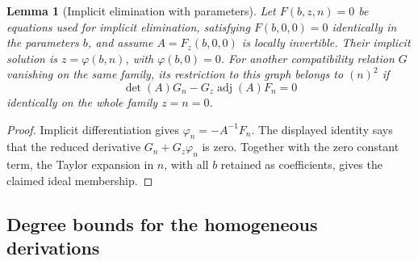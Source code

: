 \documentclass[11pt,a4paper]{article}
\numberwithin{equation}{section}
\theoremstyle{plain}
\newtheorem{lemma}[theorem]{Lemma}
\theoremstyle{definition}
\theoremstyle{remark}
\begin{document}
\begin{lemma}[Implicit elimination with parameters]\label{r3short:schur}
Let $F(b,z,n)=0$ be equations used for implicit elimination, satisfying
$F(b,0,0)=0$ identically in the parameters $b$, and assume
$A=F_z(b,0,0)$ is locally invertible. Their implicit solution is
$z=\varphi(b,n)$, with $\varphi(b,0)=0$. For another compatibility relation $G$
vanishing on the same family, its restriction to this graph belongs to
$(n)^2$ if
\[
 \det(A)G_n-G_z\operatorname{adj}(A)F_n=0
\]
identically on the whole family $z=n=0$.
\end{lemma}
\begin{proof}
Implicit differentiation gives $\varphi_n=-A^{-1}F_n$.
The displayed identity says that the reduced derivative
$G_n+G_z\varphi_n$ is zero. Together with the zero constant term, the
Taylor expansion in $n$, with all $b$ retained as coefficients, gives
the claimed ideal membership.
\end{proof}

\subsection{Degree bounds for the homogeneous derivations}
\label{appr3:fielddegrees}
\end{document}
